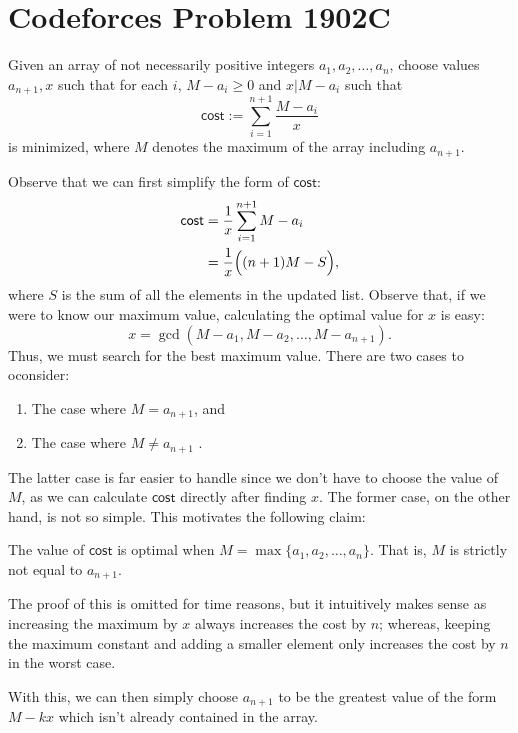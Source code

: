 \documentclass[a4paper, 12pt]{article}
\begin{document}
\section*{Codeforces Problem 1902C}

\begin{chirpbox}
\begin{problem}
    Given an array of not necessarily positive integers \( a_1, a_2, \ldots, a_n \), choose values \( a_{n+1}, x \) such that for each \( i \), \( M - a_i \ge 0 \) and \( x \vert M - a_i \) such that
    \[
        \textsf{cost} := \sum_{i = 1}^{n+1} \frac{M - a_i}{x}
    \]
    is minimized, where \( M \) denotes the maximum of the array including \( a_{n+1} \).
\end{problem}
\end{chirpbox}

\begin{solution}
    Observe that we can first simplify the form of \( \textsf{cost} \):
    \begin{align*}
        \textsf{cost} &= \frac{1}{x} \sum_{i = 1}^{n + 1} M - a_i \\
        &= \frac{1}{x} \Bigl( (n+1) M - S \Bigr)
    ,\end{align*}
    where \( S \) is the sum of all the elements in the updated list. Observe that, if we were to know our maximum value, calculating the optimal value for \( x \) is easy:
    \[
        x = \gcd(M - a_1, M - a_2, \ldots, M - a_{n+1})
    .\]
    Thus, we must search for the best maximum value. There are two cases to oconsider:
    \begin{enumerate}[topsep=0pt]
        \item The case where \( M = a_{n + 1} \), and
        \item The case where \( M \ne a_{n+1} \)
    .\end{enumerate}
    The latter case is far easier to handle since we don't have to choose the value of \( M \), as we can calculate \( \textsf{cost} \) directly after finding \( x \). The former case, on the other hand, is not so simple. This motivates the following claim:
    \begin{claim}
        The value of \( \textsf{cost} \) is optimal when \( M = \max\{ a_1, a_2, \ldots, a_n \} \). That is, \( M \) is strictly not equal to \( a_{n+1} \).
    \end{claim}
    The proof of this is omitted for time reasons, but it intuitively makes sense as increasing the maximum by \( x \) always increases the cost by \( n \); whereas, keeping the maximum constant and adding a smaller element only increases the cost by \( n \) in the worst case.

    With this, we can then simply choose \( a_{n+1} \) to be the greatest value of the form \( M - kx \) which isn't already contained in the array.
\end{solution}
\end{document}
